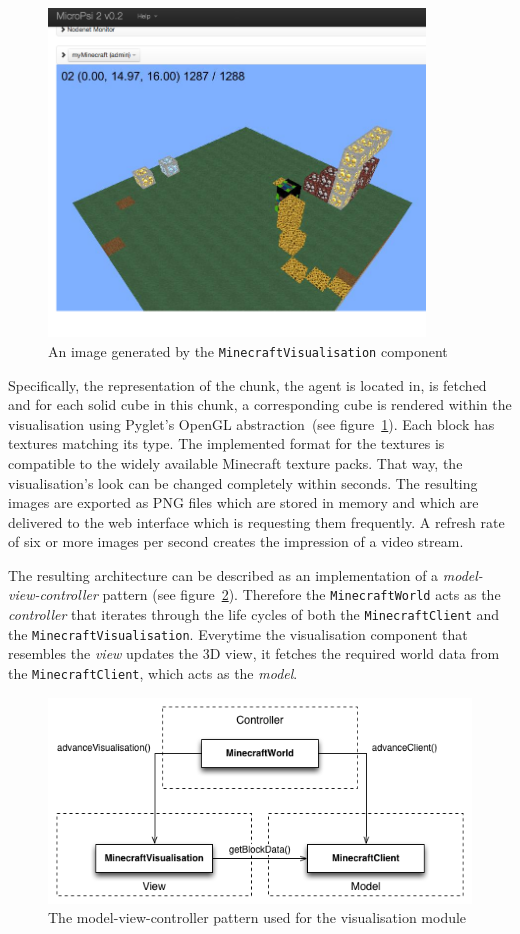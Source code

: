\begin{figure}[h]
  \centering
    \includegraphics[width=10cm]{graphics/visualisation_screen}
  \caption{An image generated by the \texttt{MinecraftVisualisation} component}
  \label{vis_screen}
\end{figure}

Specifically, the representation of the chunk, the agent is located in, is fetched and for each solid cube in this chunk, a corresponding cube is rendered within the visualisation using Pyglet's OpenGL abstraction~(see figure~\ref{vis_screen}). Each block has textures matching its type. The implemented format for the textures is compatible to the widely available Minecraft texture packs. That way, the visualisation's look can be changed completely within seconds. The resulting images are exported as PNG files which are stored in memory and which are delivered to the web interface which is requesting them frequently. A refresh rate of six or more images per second creates the impression of a video stream.

The resulting architecture can be described as an implementation of a \emph{model-view-controller} pattern (see figure~\ref{mvc}). Therefore the \texttt{MinecraftWorld} acts as the \emph{controller} that iterates through the life cycles of both the \texttt{MinecraftClient} and the \texttt{MinecraftVisualisation}. Everytime the visualisation component that resembles the \emph{view} updates the 3D view, it fetches the required world data from the \texttt{MinecraftClient}, which acts as the \emph{model}.

\begin{figure}[h]
  \centering
    \includegraphics[width=12cm]{graphics/mvc}
  \caption{The model-view-controller pattern used for the visualisation module}
  \label{mvc}
\end{figure}

